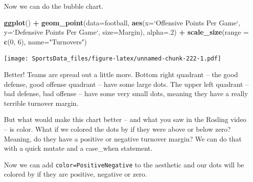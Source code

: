 \documentclass[
]{book}
\newenvironment{Shaded}{\begin{snugshade}}{\end{snugshade}}
\newcommand{\DataTypeTok}[1]{\textcolor[rgb]{0.13,0.29,0.53}{#1}}
\newcommand{\DecValTok}[1]{\textcolor[rgb]{0.00,0.00,0.81}{#1}}
\newcommand{\KeywordTok}[1]{\textcolor[rgb]{0.13,0.29,0.53}{\textbf{#1}}}
\newcommand{\NormalTok}[1]{#1}
\newcommand{\OperatorTok}[1]{\textcolor[rgb]{0.81,0.36,0.00}{\textbf{#1}}}
\newcommand{\StringTok}[1]{\textcolor[rgb]{0.31,0.60,0.02}{#1}}
\begin{document}
Now we can do the bubble chart.

\begin{Shaded}
\begin{Highlighting}[]
\KeywordTok{ggplot}\NormalTok{() }\OperatorTok{+}\StringTok{ }\KeywordTok{geom_point}\NormalTok{(}\DataTypeTok{data=}\NormalTok{football, }\KeywordTok{aes}\NormalTok{(}\DataTypeTok{x=}\StringTok{`}\DataTypeTok{Offensive Points Per Game}\StringTok{`}\NormalTok{, }\DataTypeTok{y=}\StringTok{`}\DataTypeTok{Defensive Points Per Game}\StringTok{`}\NormalTok{, }\DataTypeTok{size=}\NormalTok{Margin), }\DataTypeTok{alpha=}\NormalTok{.}\DecValTok{2}\NormalTok{) }\OperatorTok{+}\StringTok{ }\KeywordTok{scale_size}\NormalTok{(}\DataTypeTok{range =} \KeywordTok{c}\NormalTok{(}\DecValTok{0}\NormalTok{, }\DecValTok{6}\NormalTok{), }\DataTypeTok{name=}\StringTok{"Turnovers"}\NormalTok{)}
\end{Highlighting}
\end{Shaded}

\texttt{[image: SportsData\_files/figure-latex/unnamed-chunk-222-1.pdf]}

Better! Teams are spread out a little more. Bottom right quadrant -- the good defense, good offense quadrant -- have some large dots. The upper left quadrant -- bad defense, bad offense -- have some very small dots, meaning they have a really terrible turnover margin.

But what would make this chart better -- and what you saw in the Rosling video -- is color. What if we colored the dots by if they were above or below zero? Meaning, do they have a positive or negative turnover margin? We can do that with a quick mutate and a case\_when statement.

\begin{Shaded}
\end{Shaded}

Now we can add \texttt{color=PositiveNegative} to the aesthetic and our dots will be colored by if they are positive, negative or zero.
\end{document}
